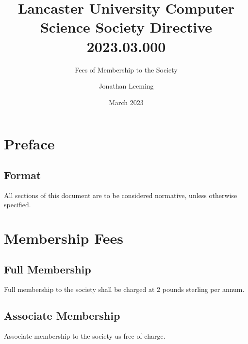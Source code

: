 \documentclass{scrartcl}
\title{Lancaster University Computer Science Society Directive 2023.03.000}
\subtitle{Fees of Membership to the Society}
\author{Jonathan Leeming}
\date{March 2023}
\begin{document}
    \maketitle
    
    \clearpage
    \tableofcontents

    \clearpage
    \section{Preface}
        \label{preface}
        \subsection{Format}
            \label{preface--format}
            All sections of this document are to be considered normative, unless otherwise specified.

    \section{Membership Fees}
        \label{fees}
        \subsection{Full Membership}
            \label{fees--full}
            Full membership to the society shall be charged at 2 pounds sterling per annum.

        \subsection{Associate Membership}
            \label{fees-associate}
            Associate membership to the society us free of charge.
    \clearpage
\end{document}
